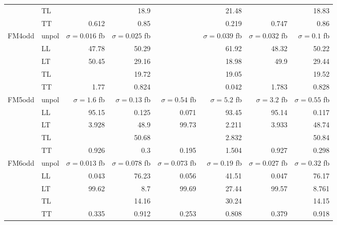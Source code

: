 \begin{table}[h]
{\begin{tabular}{llrrrrrr}
 & TL &  & \num{18.9} &  & \num{21.48} &  & \num{18.83} \\
 & TT & \num{0.612} & \num{0.85} &  & \num{0.219} & \num{0.747} & \num{0.86} \\
\midrule
\multirow{5}{*}{FM4odd}
 & unpol & $\sigma = \num{0.016}$ fb & $\sigma = \num{0.025}$ fb &  & $\sigma = \num{0.039}$ fb & $\sigma = \num{0.032}$ fb & $\sigma = \num{0.1}$ fb \\
 & LL & \num{47.78} & \num{50.29} &  & \num{61.92} & \num{48.32} & \num{50.22} \\
 & LT & \num{50.45} & \num{29.16} &  & \num{18.98} & \num{49.9} & \num{29.44} \\
 & TL &  & \num{19.72} &  & \num{19.05} &  & \num{19.52} \\
 & TT & \num{1.77} & \num{0.824} &  & \num{0.042} & \num{1.783} & \num{0.828} \\
\midrule
\multirow{5}{*}{FM5odd}
 & unpol & $\sigma = \num{1.6}$ fb & $\sigma = \num{0.13}$ fb & $\sigma = \num{0.54}$ fb & $\sigma = \num{5.2}$ fb & $\sigma = \num{3.2}$ fb & $\sigma = \num{0.55}$ fb \\
 & LL & \num{95.15} & \num{0.125} & \num{0.071} & \num{93.45} & \num{95.14} & \num{0.117} \\
 & LT & \num{3.928} & \num{48.9} & \num{99.73} & \num{2.211} & \num{3.933} & \num{48.74} \\
 & TL &  & \num{50.68} &  & \num{2.832} &  & \num{50.84} \\
 & TT & \num{0.926} & \num{0.3} & \num{0.195} & \num{1.504} & \num{0.927} & \num{0.298} \\
\midrule
\multirow{5}{*}{FM6odd}
 & unpol & $\sigma = \num{0.013}$ fb & $\sigma = \num{0.078}$ fb & $\sigma = \num{0.073}$ fb & $\sigma = \num{0.19}$ fb & $\sigma = \num{0.027}$ fb & $\sigma = \num{0.32}$ fb \\
 & LL & \num{0.043} & \num{76.23} & \num{0.056} & \num{41.51} & \num{0.047} & \num{76.17} \\
 & LT & \num{99.62} & \num{8.7} & \num{99.69} & \num{27.44} & \num{99.57} & \num{8.761} \\
 & TL &  & \num{14.16} &  & \num{30.24} &  & \num{14.15} \\
 & TT & \num{0.335} & \num{0.912} & \num{0.253} & \num{0.808} & \num{0.379} & \num{0.918} \\
\bottomrule
\end{tabular}
}%
\end{table}